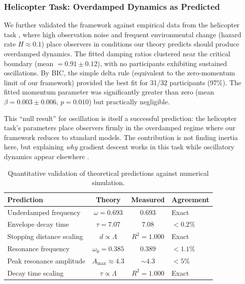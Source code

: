 \documentclass[12pt]{article}
\begin{document}
\subsubsection{Helicopter Task: Overdamped Dynamics as Predicted}

We further validated the framework against empirical data from the helicopter task \citep{mcguire2014}, where high observation noise and frequent environmental change (hazard rate $H \approx 0.1$) place observers in conditions our theory predicts should produce overdamped dynamics. The fitted damping ratios clustered near the critical boundary (mean $= 0.91 \pm 0.12$), with no participants exhibiting sustained oscillations. By BIC, the simple delta rule (equivalent to the zero-momentum limit of our framework) provided the best fit for 31/32 participants (97\%). The fitted momentum parameter was significantly greater than zero (mean $\beta = 0.003 \pm 0.006$, $p = 0.010$) but practically negligible.

This ``null result'' for oscillation is itself a successful prediction: the helicopter task's parameters place observers firmly in the overdamped regime where our framework reduces to standard models. The contribution is not finding inertia here, but explaining \emph{why} gradient descent works in this task while oscillatory dynamics appear elsewhere \citep{kaplowitz1992, burge2010}.

\begin{table}[ht]
\centering
\caption{Quantitative validation of theoretical predictions against numerical simulation.}
\label{tab:validation}
\begin{tabular}{@{} l c c l @{}}
\toprule
\textbf{Prediction} & \textbf{Theory} & \textbf{Measured} & \textbf{Agreement} \\
\midrule
Underdamped frequency & $\omega = 0.693$ & $0.693$ & Exact \\
Envelope decay time & $\tau = 7.07$ & $7.08$ & $< 0.2\%$ \\
Stopping distance scaling & $d \propto \Lambda$ & $R^2 = 1.000$ & Exact \\
Resonance frequency & $\omega_0 = 0.385$ & $0.389$ & $< 1.1\%$ \\
Peak resonance amplitude & $A_{\max} \approx 4.3$ & $\sim 4.3$ & $< 5\%$ \\
Decay time scaling & $\tau \propto \Lambda$ & $R^2 = 1.000$ & Exact \\
\bottomrule
\end{tabular}
\end{table}
\end{document}
